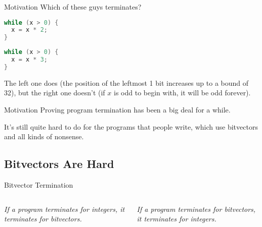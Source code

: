 \documentclass[xcolor=pdftex,t,11pt]{beamer}
\newcommand{\xmark}{\ding{55}}
\begin{document}
\begin{frame}[fragile]{Motivation}
Which of these guys terminates?
\begin{center}
\begin{minipage}{0.45\linewidth}
 \begin{lstlisting}[language=C,basicstyle=\normalsize]
while (x > 0) {
  x = x * 2;
}
\end{lstlisting}
\end{minipage}
\begin{minipage}{0.45\linewidth}
 \begin{lstlisting}[language=C,basicstyle=\normalsize]
while (x > 0) {
  x = x * 3;
}
\end{lstlisting}
\end{minipage}
\end{center}

\pause

The left one does (the position of the leftmost 1 bit increases up to a bound of 32), but the right one doesn't (if $x$ is odd to begin with, it will be odd forever).
\end{frame}


\begin{frame}{Motivation}
Proving program termination has been a big deal for a while.

\vspace{1em}

It's still quite hard to do for the programs that people write, which use bitvectors and all kinds of nonsense.
\end{frame}


\subsection{Bitvectors Are Hard}

\begin{frame}[fragile]{Bitvector Termination}
 \begin{columns}[c]
  \emph{If a program terminates for integers, it terminates for bitvectors.}

  \uncover<2->{{\centering \color{red} \Huge \xmark
  
  }
  
  
  }

  \emph{If a program terminates for bitvectors, it terminates for integers.}

  \uncover<3->{{\centering \color{red} \Huge \xmark
  
  }
  
  
  }
 \end{columns}

 \vspace{1.5em}
 
 
\end{frame}
\end{document}
